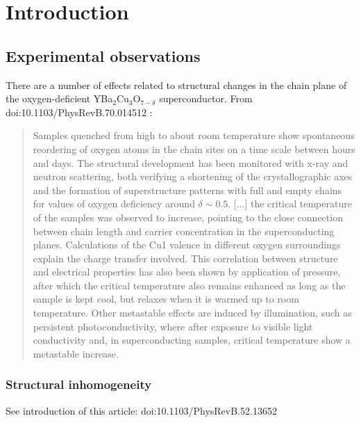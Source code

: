 \chapter{Introduction}

\section{Experimental observations}

There are a number of effects related to structural changes in the chain plane of the oxygen-deficient YBa$_{2}$Cu$_{3}$O$_{7-\delta}$ superconductor. From doi:10.1103/PhysRevB.70.014512 :

\begin{quote}
Samples quenched from high to about room temperature show spontaneous reordering of oxygen atoms in the chain sites on a time scale between hours and days. The structural development has been monitored with x-ray and neutron scattering, both verifying a shortening of the crystallographic axes and the formation of superstructure patterns with full and empty chains for values of oxygen deficiency around $\delta \sim  0.5$. [...] the critical temperature of the samples was observed to increase, pointing to the close connection between chain length and carrier concentration in the superconducting planes. Calculations of the Cu1 valence in different oxygen surroundings explain the charge transfer involved. This correlation between structure and electrical properties has also been shown by application of pressure, after which the critical temperature also remains enhanced as long as the sample is kept cool, but relaxes when it is warmed up to room temperature. Other metastable effects are induced by illumination, such as persistent photoconductivity, where after exposure to visible light conductivity and, in superconducting samples, critical temperature show a metastable increase.
\end{quote}

\subsection{Structural inhomogeneity}

See introduction of this article: doi:10.1103/PhysRevB.52.13652 

